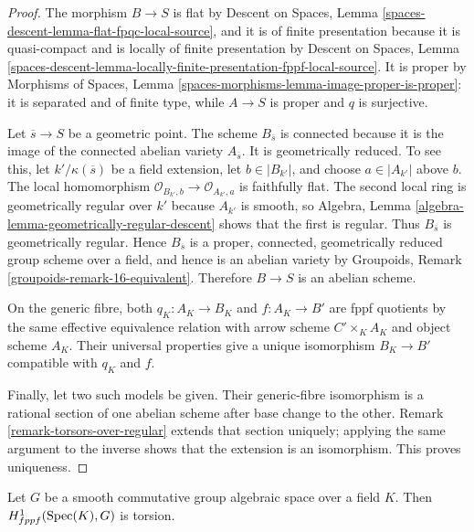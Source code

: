 \begin{proof}
The morphism $B\to S$ is flat by Descent on Spaces, Lemma
\ref{spaces-descent-lemma-flat-fpqc-local-source}, and it is of finite
presentation because it is quasi-compact and is locally of finite
presentation by Descent on Spaces, Lemma
\ref{spaces-descent-lemma-locally-finite-presentation-fppf-local-source}.
It is proper by Morphisms of Spaces, Lemma
\ref{spaces-morphisms-lemma-image-proper-is-proper}: it is separated and
of finite type, while $A\to S$ is proper and $q$ is surjective.

Let $\overline{s}\to S$ be a geometric point. The scheme
$B_{\overline{s}}$ is connected because it is the image of the connected
abelian variety $A_{\overline{s}}$. It is geometrically reduced. To see
this, let $k'/\kappa(\overline{s})$ be a field extension, let
$b\in |B_{k'}|$, and choose $a\in |A_{k'}|$ above $b$. The local homomorphism
$\mathcal{O}_{B_{k'},b}\to\mathcal{O}_{A_{k'},a}$ is faithfully flat.
The second local ring is geometrically regular over $k'$ because
$A_{k'}$ is smooth, so Algebra,
Lemma \ref{algebra-lemma-geometrically-regular-descent} shows that the
first is regular. Thus $B_{\overline{s}}$ is geometrically regular. Hence
$B_{\overline{s}}$ is a proper, connected, geometrically reduced group
scheme over a field, and hence is an abelian variety by Groupoids, Remark
\ref{groupoids-remark-16-equivalent}. Therefore $B\to S$ is an abelian
scheme.

On the generic fibre, both $q_K:A_K\to B_K$ and $f:A_K\to B'$ are fppf
quotients by the same effective equivalence relation with arrow scheme
$C'\times_K A_K$ and object scheme $A_K$. Their universal properties give a
unique isomorphism $B_K\to B'$ compatible with $q_K$ and $f$.

Finally, let two such models be given. Their generic-fibre isomorphism is a
rational section of one abelian scheme after base change to the other.
Remark \ref{remark-torsors-over-regular} extends that section uniquely;
applying the same argument to the inverse shows that the extension is an
isomorphism. This proves uniqueness.
\end{proof}

\begin{lemma}
\label{lemma-torsors-over-field-torsion}
Let $G$ be a smooth commutative group algebraic space over a field $K$.
Then $H^1_{fppf}(\mathop{\mathrm{Spec}}(K), G)$ is torsion.
\end{lemma}

